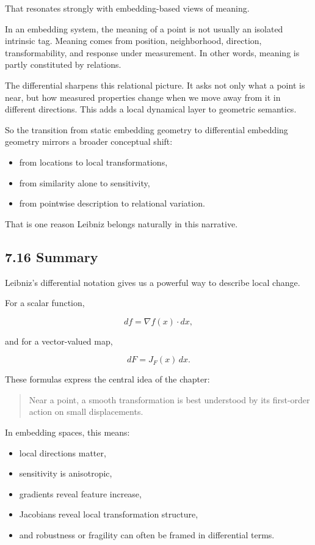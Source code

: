 That resonates strongly with embedding-based views of meaning.

In an embedding system, the meaning of a point is not usually an
isolated intrinsic tag. Meaning comes from position, neighborhood,
direction, transformability, and response under measurement. In other
words, meaning is partly constituted by relations.

The differential sharpens this relational picture. It asks not only what
a point is near, but how measured properties change when we move away
from it in different directions. This adds a local dynamical layer to
geometric semantics.

So the transition from static embedding geometry to differential
embedding geometry mirrors a broader conceptual shift:

\begin{itemize}
\tightlist
\item
  from locations to local transformations,
\item
  from similarity alone to sensitivity,
\item
  from pointwise description to relational variation.
\end{itemize}

That is one reason Leibniz belongs naturally in this narrative.

\hypertarget{summary}{%
\subsection{7.16 Summary}\label{summary}}

Leibniz's differential notation gives us a powerful way to describe
local change.

For a scalar function,

\[ 
df = \nabla f(x)\cdot dx,
\]

and for a vector-valued map,

\[
dF = J_F(x)\,dx.
\]

These formulas express the central idea of the chapter:

\begin{quote}
Near a point, a smooth transformation is best understood by its
first-order action on small displacements.
\end{quote}

In embedding spaces, this means:

\begin{itemize}
\tightlist
\item
  local directions matter,
\item
  sensitivity is anisotropic,
\item
  gradients reveal feature increase,
\item
  Jacobians reveal local transformation structure,
\item
  and robustness or fragility can often be framed in differential terms.
\end{itemize}

